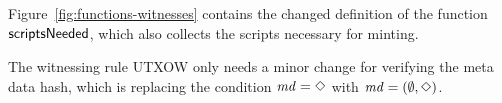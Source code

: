 Figure~\ref{fig:functions-witnesses} contains the changed definition
of the function $\mathsf{scriptsNeeded}$, which also collects the scripts
necessary for minting.

The witnessing rule UTXOW only needs a minor change for verifying the meta data hash,
which is replacing the condition $\mathit{md} = \Diamond$ with $\mathit{md} = (\emptyset, \Diamond)$.
